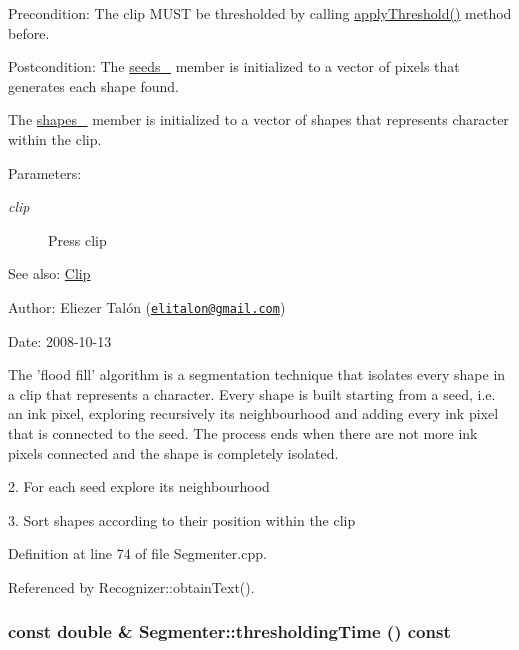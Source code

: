 \begin{Desc}
\item[Precondition:]The clip MUST be thresholded by calling \hyperlink{class_segmenter_6854315e3320f9d9a8ece14cbb8570ee}{applyThreshold()} method before.\end{Desc}
\begin{Desc}
\item[Postcondition:]The \hyperlink{class_segmenter_32db9acb9fe721613eb98c7bb8d2a8f0}{seeds\_\-} member is initialized to a vector of pixels that generates each shape found. 

The \hyperlink{class_segmenter_3040cc000907ef44e820ddcf70de6f08}{shapes\_\-} member is initialized to a vector of shapes that represents character within the clip.\end{Desc}
\begin{Desc}
\item[Parameters:]
\begin{description}
\item[{\em clip}]Press clip\end{description}
\end{Desc}
\begin{Desc}
\item[See also:]\hyperlink{class_clip}{Clip}\end{Desc}
\begin{Desc}
\item[Author:]Eliezer Talón (\href{mailto:elitalon@gmail.com}{\tt elitalon@gmail.com}) \end{Desc}
\begin{Desc}
\item[Date:]2008-10-13\end{Desc}
The 'flood fill' algorithm is a segmentation technique that isolates every shape in a clip that represents a character. Every shape is built starting from a seed, i.e. an ink pixel, exploring recursively its neighbourhood and adding every ink pixel that is connected to the seed. The process ends when there are not more ink pixels connected and the shape is completely isolated. 

2. For each seed explore its neighbourhood

3. Sort shapes according to their position within the clip 

Definition at line 74 of file Segmenter.cpp.

Referenced by Recognizer::obtainText().\hypertarget{class_segmenter_52f771c61d667df4f552ee73dc9f22e7}{
\subsubsection[thresholdingTime]{\setlength{\rightskip}{0pt plus 5cm}const double \& Segmenter::thresholdingTime () const}}
\label{class_segmenter_52f771c61d667df4f552ee73dc9f22e7}


